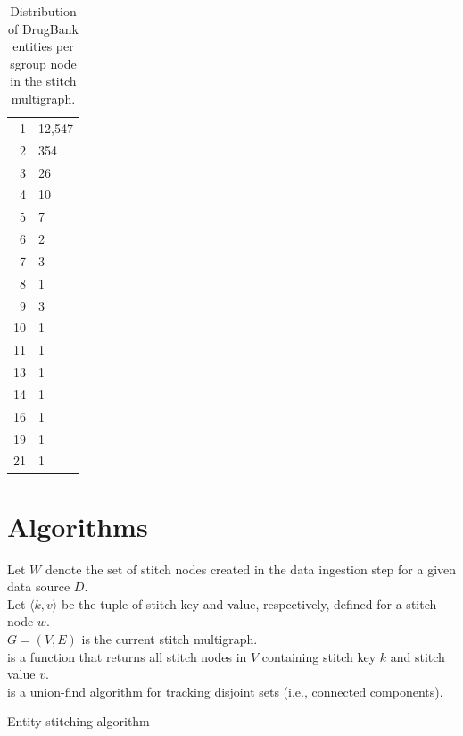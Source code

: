 \documentclass{bmcart}
\begin{document}
\begin{backmatter}
\begin{table}[ht!]
  \caption{Distribution of DrugBank entities per sgroup node in the
    stitch multigraph.\label{tab:drugbank-dist}}
  \begin{tabular}{@{}rl@{}}\toprule
1 & 12,547\\ 
2 & 354\\
3 & 26\\
4 & 10\\
5 & 7\\
6 & 2\\
7 & 3\\
8 & 1\\
9 & 3\\
10 & 1\\
11 & 1\\
13 & 1\\
14 & 1\\
16 & 1\\
19 & 1\\
21 & 1\\ \bottomrule
  \end{tabular}
\end{table}

\section*{Algorithms}
\begin{algorithm}[ht!]\label{algo:stitching}
\SetAlgoLined
\DontPrintSemicolon
Let $W$ denote the set of stitch nodes created in the data ingestion
step for a given data source $D$.\\
Let $\langle k, v\rangle$ be the tuple of stitch key and value,
respectively, defined for a stitch node $w$.\\
$G=(V,E)$ is the current stitch multigraph.\\
 is a function that returns all stitch nodes in $V$
containing stitch key $k$ and stitch value $v$.\\
 is a union-find algorithm for tracking disjoint sets
(i.e., connected components).\\
 \caption{Entity stitching algorithm}
\end{algorithm}


\end{backmatter}
\end{document}
